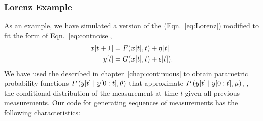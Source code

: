 \subsubsection{Lorenz Example}

As an example, we have simulated a version of the %
 (Eqn.~\eqref{eq:Lorenz}) modified to fit the
form of Eqn.~\eqref{eq:contnoise},
\begin{align*}
  {x}{[t+1]} &= F({x}{[t]},t) + {\eta}{[t]}\\
  {y}{[t]}   &= G({x}{[t]},t) + {\epsilon}{[t]}).
\end{align*}
We have used the  described in
chapter~\ref{chap:continuous} to obtain parametric probability
functions $P\left({y}{[t]}\mid y[0:t] , \theta \right)$ that
approximate $P\left({y}{[t]}\mid y[0:t], \mu \right)$, \ie, the
conditional distribution of the measurement at time $t$ given all
previous measurements.  Our code for generating sequences of
measurements has the following characteristics:
